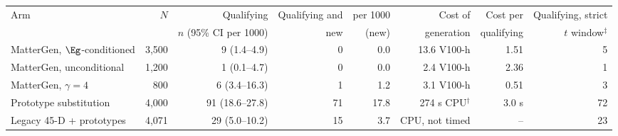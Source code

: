 \begin{tabular}{@{}lrrrrrrr@{}}\toprule
 Arm & $N$ & Qualifying & Qualifying and & per 1000 & Cost of & Cost per & Qualifying, strict\\
 & & $n$ (95\% CI per 1000) & new & (new) & generation & qualifying & $t$ window$^\ddagger$\\\midrule
MatterGen, $\Eg$-conditioned & 3{,}500 & 9 (1.4--4.9) & 0 & 0.0 & 13.6 V100-h & 1.51 & 5 \\
MatterGen, unconditional & 1{,}200 & 1 (0.1--4.7) & 0 & 0.0 & 2.4 V100-h & 2.36 & 1 \\
MatterGen, $\gamma{=}4$ & 800 & 6 (3.4--16.3) & 1 & 1.2 & 3.1 V100-h & 0.51 & 3 \\
Prototype substitution & 4{,}000 & 91 (18.6--27.8) & 71 & 17.8 & 274 s CPU$^{\dagger}$ & 3.0 s & 72 \\
Legacy 45-D + prototypes & 4{,}071 & 29 (5.0--10.2) & 15 & 3.7 & CPU, not timed & -- & 23 \\
\bottomrule\end{tabular}
